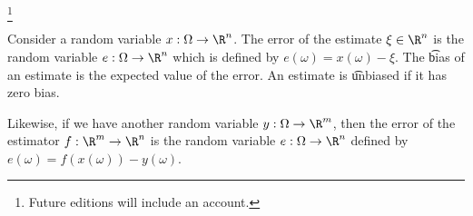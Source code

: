 

\footnote{Future editions will include an account.}


Consider a random variable $x: \Omega \to \R^n$.
The error of the estimate $\xi \in \R^n$ is the random variable $e: \Omega \to \R^n$ which is defined by $e(\omega) = x(\omega) - \xi$.
The \t{bias} of an estimate is the expected value of the error.
An estimate is \t{unbiased} if it has zero bias.

Likewise, if we have another random variable $y: \Omega \to \R^m$, then the error of the estimator $f: \R^m \to \R^n$ is the random variable $e: \Omega \to \R^n$ defined by $e(\omega) = f(x(\omega)) - y(\omega)$.

\blankpage
